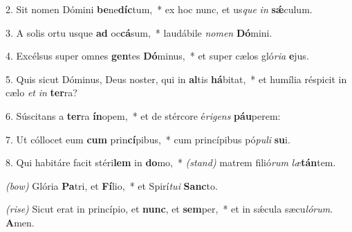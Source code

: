2. Sit nomen Dómini \textbf{be}ne\textbf{díc}tum,~* ex hoc nunc, et us\textit{que} \textit{in} \textbf{s\'{\ae}}culum.

3. A solis ortu usque \textbf{ad} oc\textbf{cá}sum,~* laudábile \textit{no}\textit{men} \textbf{Dó}mini.

4. Excélsus super omnes \textbf{gen}tes \textbf{Dó}minus,~* et super cælos gló\textit{ri}\textit{a} \textbf{e}jus.

5. Quis sicut Dóminus, Deus noster, qui in \textbf{al}tis \textbf{há}bitat,~* et humília réspicit in cælo \textit{et} \textit{in} \textbf{ter}ra?

6. Súscitans a \textbf{ter}ra \textbf{ín}opem,~* et de stércore é\textit{ri}\textit{gens} \textbf{páu}perem:

7. Ut cóllocet eum \textbf{cum} prin\textbf{cí}pibus,~* cum princípibus pó\textit{pu}\textit{li} \textbf{su}i.

8. Qui habitáre facit stéri\textbf{lem} in \textbf{do}mo,~* {\color{red}\textit{(stand)}} matrem filió\textit{rum} \textit{læ}\textbf{tán}tem.

{\color{red}\textit{(bow)}} Glória \textbf{Pa}tri, et \textbf{Fí}lio,~* et Spirí\textit{tu}\textit{i} \textbf{Sanc}to.

{\color{red}\textit{(rise)}} Sicut erat in princípio, et \textbf{nunc}, et \textbf{sem}per,~* et in s\'{\ae}cula sæcu\textit{ló}\textit{rum}. \textbf{A}men.